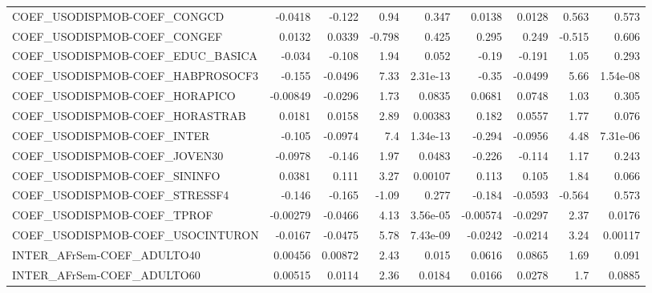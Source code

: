 \begin{tabular}{lrrrrrrrr}
COEF\_USODISPMOB-COEF\_CONGCD            &     -0.0418 &       -0.122 &     0.94 &    0.347 &     0.0138 &      0.0128 &        0.563 &         0.573 \\
COEF\_USODISPMOB-COEF\_CONGEF            &      0.0132 &       0.0339 &   -0.798 &    0.425 &      0.295 &       0.249 &       -0.515 &         0.606 \\
COEF\_USODISPMOB-COEF\_EDUC\_BASICA       &      -0.034 &       -0.108 &     1.94 &    0.052 &      -0.19 &      -0.191 &         1.05 &         0.293 \\
COEF\_USODISPMOB-COEF\_HABPROSOCF3       &      -0.155 &      -0.0496 &     7.33 & 2.31e-13 &      -0.35 &     -0.0499 &         5.66 &      1.54e-08 \\
COEF\_USODISPMOB-COEF\_HORAPICO          &    -0.00849 &      -0.0296 &     1.73 &   0.0835 &     0.0681 &      0.0748 &         1.03 &         0.305 \\
COEF\_USODISPMOB-COEF\_HORASTRAB         &      0.0181 &       0.0158 &     2.89 &  0.00383 &      0.182 &      0.0557 &         1.77 &         0.076 \\
COEF\_USODISPMOB-COEF\_INTER             &      -0.105 &      -0.0974 &      7.4 & 1.34e-13 &     -0.294 &     -0.0956 &         4.48 &      7.31e-06 \\
COEF\_USODISPMOB-COEF\_JOVEN30           &     -0.0978 &       -0.146 &     1.97 &   0.0483 &     -0.226 &      -0.114 &         1.17 &         0.243 \\
COEF\_USODISPMOB-COEF\_SININFO           &      0.0381 &        0.111 &     3.27 &  0.00107 &      0.113 &       0.105 &         1.84 &         0.066 \\
COEF\_USODISPMOB-COEF\_STRESSF4          &      -0.146 &       -0.165 &    -1.09 &    0.277 &     -0.184 &     -0.0593 &       -0.564 &         0.573 \\
COEF\_USODISPMOB-COEF\_TPROF             &    -0.00279 &      -0.0466 &     4.13 & 3.56e-05 &   -0.00574 &     -0.0297 &         2.37 &        0.0176 \\
COEF\_USODISPMOB-COEF\_USOCINTURON       &     -0.0167 &      -0.0475 &     5.78 & 7.43e-09 &    -0.0242 &     -0.0214 &         3.24 &       0.00117 \\
INTER\_AFrSem-COEF\_ADULTO40             &     0.00456 &      0.00872 &     2.43 &    0.015 &     0.0616 &      0.0865 &         1.69 &         0.091 \\
INTER\_AFrSem-COEF\_ADULTO60             &     0.00515 &       0.0114 &     2.36 &   0.0184 &     0.0166 &      0.0278 &          1.7 &        0.0885 \\

\end{tabular}
